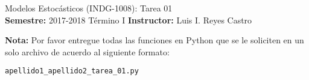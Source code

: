 \documentclass[ a4paper, twoside, 11pt]{article}
\newcommand{\numero}{01}
\begin{document}
\allowdisplaybreaks



\begin{center}
\Large Modelos Estoc\'asticos (INDG-1008): Tarea \numero \\[1ex]
\small \textbf{Semestre:} 2017-2018 T\'ermino I \qquad
\textbf{Instructor:} Luis I. Reyes Castro
\end{center}
\fullskip

%

\textbf{Nota:} Por favor entregue todas las funciones en Python que se le soliciten en un solo archivo de acuerdo al siguiente formato: 
\halfcut
\begin{center}
{\tt apellido1\_apellido2\_tarea\_01.py }
\end{center}
\fullskip
\halfskip
\end{document}
